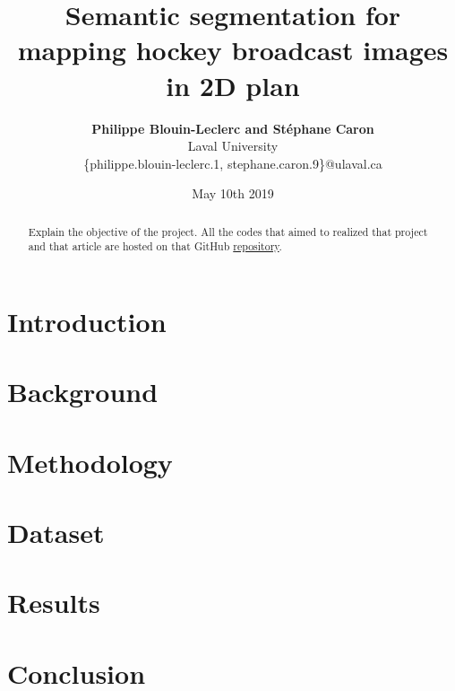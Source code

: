 \documentclass[10pt,letterpaper]{article}
\title{{\huge \bf Semantic segmentation for mapping hockey broadcast images in 2D plan}}
\author{{\bf Philippe Blouin-Leclerc and Stéphane Caron} \\ {Laval University} \\
{\{philippe.blouin-leclerc.1, stephane.caron.9\}}@ulaval.ca}
\date{May 10th 2019}
\numberwithin{equation}{section}
\begin{document}
\maketitle

\begin{multicols}{2}

\begin{abstract}
Explain the objective of the project. All the codes that aimed to realized that project and that article are hosted on that GitHub \href{https://github.com/stecaron/glo-7030-projet}{repository}.
\end{abstract}


\section{Introduction}




\section{Background}




\section{Methodology}




\section{Dataset}




\section{Results}




\section{Conclusion}




\nocite{hastie01statisticallearning}



\setlength{\bibleftmargin}{.125in}
\setlength{\bibindent}{-\bibleftmargin}



\end{multicols}
\end{document}
